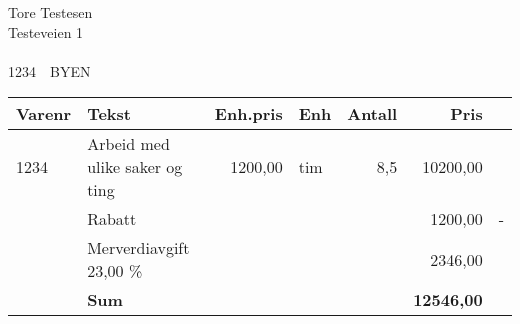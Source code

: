 \documentclass[a4paper]{giro}
\begin{document}
\address{Vollsveien 133\\\ \\1358\ \ JAR}

\begin{giro}{Tore Testesen\\Testeveien 1\\\ \\1234\ \
    BYEN}


\begin{tabular}[t]{lp{8cm}rlrr@{\,}l}
\bf Varenr & \bf Tekst & \bf Enh.pris & \bf Enh & \bf Antall & \bf
Pris & \\\hline
1234 & Arbeid med ulike saker og ting & 1200,00 & tim & 8,5 & 10200,00
& \\
& Rabatt & & & & 1200,00 & - \\
& Merverdiavgift 23,00 \% & & & & 2346,00 & \\\hline
& \bf Sum & & & & \bf 12546,00 \\\hline
\end{tabular}
\end{giro}
\end{document}
